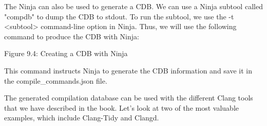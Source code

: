 The Ninja can also be used to generate a CDB. We can use a Ninja subtool called "compdb" to dump the CDB to stdout. To run the subtool, we use the -t <subtool> command-line option in Ninja. Thus, we will use the following command to produce the CDB with Ninja:


\begin{center}
Figure 9.4: Creating a CDB with Ninja
\end{center}

This command instructs Ninja to generate the CDB information and save it in the compile\_commands.json file.

The generated compilation database can be used with the different Clang tools that we have described in the book. Let's look at two of the most valuable examples, which include Clang-Tidy and Clangd.










